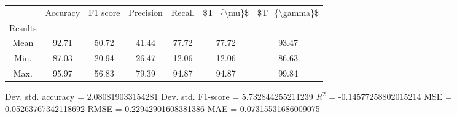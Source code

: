\begin{tabular}{|c|c|c|c|c|c|c|}
\toprule
{} &  Accuracy &  F1 score &  Precision &  Recall &  \$T\_\{\textbackslash mu\}\$ &  \$T\_\{\textbackslash gamma\}\$ \\
Results &           &           &            &         &            &               \\
\hline
Mean    &     92.71 &     50.72 &      41.44 &   77.72 &      77.72 &         93.47 \\
Min.    &     87.03 &     20.94 &      26.47 &   12.06 &      12.06 &         86.63 \\
Max.    &     95.97 &     56.83 &      79.39 &   94.87 &      94.87 &         99.84 \\
\bottomrule
\end{tabular}

 Dev. std. accuracy = 2.080819033154281
 Dev. std. F1-score = 5.732844255211239
 $R^2$ = -0.14577258802015214
 MSE = 0.05263767342118692
 RMSE = 0.22942901608381386
 MAE = 0.07315531686009075